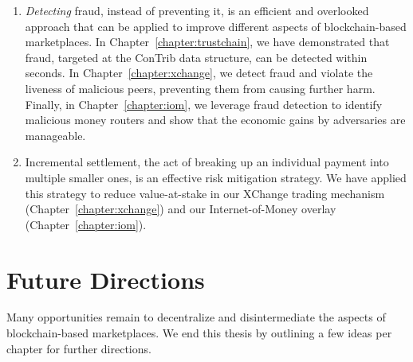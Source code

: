 \begin{enumerate}
	\item \emph{Detecting} fraud, instead of preventing it, is an efficient and overlooked approach that can be applied to improve different aspects of blockchain-based marketplaces.
	In Chapter~\ref{chapter:trustchain}, we have demonstrated that fraud, targeted at the ConTrib data structure, can be detected within seconds.
	In Chapter~\ref{chapter:xchange}, we detect fraud and violate the liveness of malicious peers, preventing them from causing further harm.
	Finally, in Chapter~\ref{chapter:iom}, we leverage fraud detection to identify malicious money routers and show that the economic gains by adversaries are manageable.
	
	\item Incremental settlement, the act of breaking up an individual payment into multiple smaller ones, is an effective risk mitigation strategy.
	We have applied this strategy to reduce value-at-stake in our XChange trading mechanism (Chapter~\ref{chapter:xchange}) and our Internet-of-Money overlay (Chapter~\ref{chapter:iom}).
\end{enumerate}



\section{Future Directions}
Many opportunities remain to decentralize and disintermediate the aspects of blockchain-based marketplaces.
We end this thesis by outlining a few ideas per chapter for further directions.

